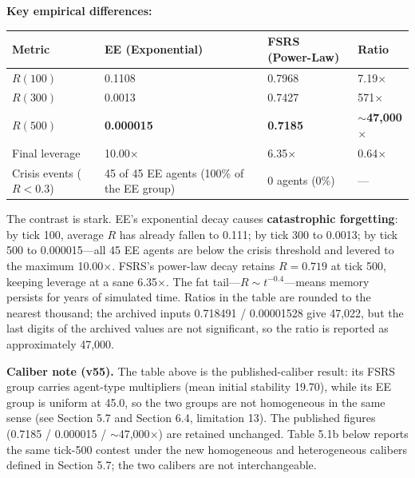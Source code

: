 \documentclass[11pt]{article}
\begin{document}
\textbf{Key empirical differences:}

\begin{table}[htbp]
\centering
\begin{tabular}{llll}
\toprule
\textbf{Metric} & \textbf{EE (Exponential)} & \textbf{FSRS (Power-Law)} & \textbf{Ratio} \\
\midrule
$R(100)$ & 0.1108 & 0.7968 & 7.19$\times$ \\
$R(300)$ & 0.0013 & 0.7427 & 571$\times$ \\
$R(500)$ & \textbf{0.000015} & \textbf{0.7185} & \textbf{$\sim$47,000$\times$} \\
Final leverage & 10.00$\times$ & 6.35$\times$ & 0.64$\times$ \\
Crisis events ($R<0.3$) & 45 of 45 EE agents (100\% of the EE group) & 0 agents (0\%) & --- \\
\bottomrule
\end{tabular}
\end{table}

The contrast is stark. EE's exponential decay causes \textbf{catastrophic forgetting}: by tick 100, average $R$ has already fallen to 0.111; by tick 300 to 0.0013; by tick 500 to 0.000015---all 45 EE agents are below the crisis threshold and levered to the maximum 10.00$\times$. FSRS's power-law decay retains $R=0.719$ at tick 500, keeping leverage at a sane 6.35$\times$. The fat tail---$R \sim t^{-0.4}$---means memory persists for years of simulated time. Ratios in the table are rounded to the nearest thousand; the archived inputs 0.718491 / 0.00001528 give 47,022, but the last digits of the archived values are not significant, so the ratio is reported as approximately 47,000.

\textbf{Caliber note (v55).} The table above is the published-caliber result: its FSRS group carries agent-type multipliers (mean initial stability 19.70), while its EE group is uniform at 45.0, so the two groups are not homogeneous in the same sense (see Section 5.7 and Section 6.4, limitation 13). The published figures (0.7185 / 0.000015 / $\sim$47,000$\times$) are retained unchanged. Table 5.1b below reports the same tick-500 contest under the new homogeneous and heterogeneous calibers defined in Section 5.7; the two calibers are not interchangeable.
\end{document}
